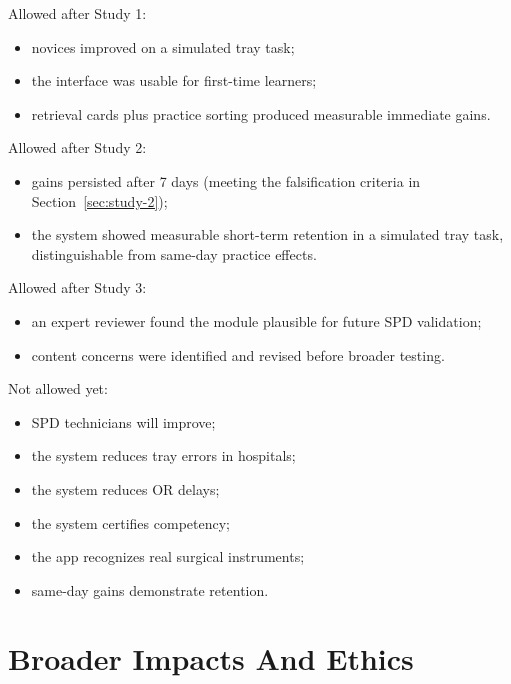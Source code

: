 \documentclass[10pt,a4paper]{article}
\begin{document}
Allowed after Study 1:
\begin{itemize}
  \item novices improved on a simulated tray task;
  \item the interface was usable for first-time learners;
  \item retrieval cards plus practice sorting produced measurable immediate gains.
\end{itemize}
Allowed after Study 2:
\begin{itemize}
  \item gains persisted after 7 days (meeting the falsification criteria in Section~\ref{sec:study-2});
  \item the system showed measurable short-term retention in a simulated tray task, distinguishable from same-day practice effects.
\end{itemize}
Allowed after Study 3:
\begin{itemize}
  \item an expert reviewer found the module plausible for future SPD validation;
  \item content concerns were identified and revised before broader testing.
\end{itemize}
Not allowed yet:
\begin{itemize}
  \item SPD technicians will improve;
  \item the system reduces tray errors in hospitals;
  \item the system reduces OR delays;
  \item the system certifies competency;
  \item the app recognizes real surgical instruments;
  \item same-day gains demonstrate retention.
\end{itemize}



\section{Broader Impacts And Ethics}
\label{sec:broader-impacts-and-ethics}
\end{document}
